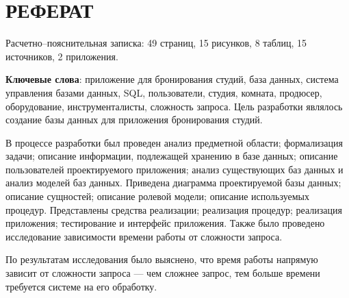 \chapter*{РЕФЕРАТ}
Расчетно--пояснительная записка: 49 страниц, 15 рисунков, 8 таблиц, 15 источников, 2 приложения.

\textbf{Ключевые слова}: приложение для бронирования студий, база данных, система управления базами данных, SQL, пользователи, студия, комната, продюсер, оборудование, инструменталисты, сложность запроса.
Цель разработки являлось создание базы данных для приложения бронирования студий.

В процессе разработки был проведен анализ предметной области; формализация задачи; описание информации, подлежащей хранению в базе данных; описание пользователей проектируемого приложения; анализ существующих баз данных и анализ моделей баз данных.
Приведена диаграмма проектируемой базы данных; описание сущностей; описание ролевой модели; описание используемых процедур.
Представлены средства реализации; реализация процедур; реализация приложения; тестирование и интерфейс приложения.
Также было проведено исследование зависимости времени работы от сложности запроса.

По результатам исследования было выяснено, что время работы напрямую зависит от сложности запроса --- чем сложнее запрос, тем больше времени требуется системе на его обработку.